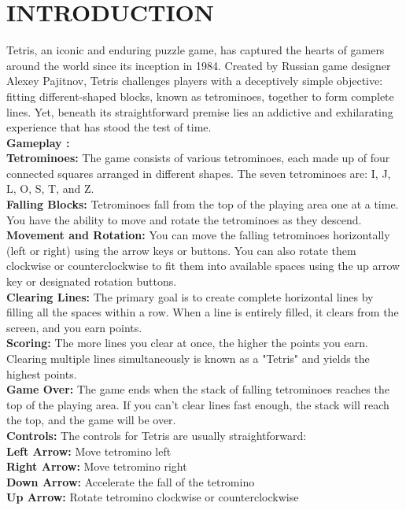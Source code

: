 \newpage
\section{INTRODUCTION}
\hspace{5mm}Tetris, an iconic and enduring puzzle game, has captured the hearts of gamers around the world since its inception in 1984. Created by Russian game designer Alexey Pajitnov, Tetris challenges players with a deceptively simple objective: fitting different-shaped blocks, known as tetrominoes, together to form complete lines. Yet, beneath its straightforward premise lies an addictive and exhilarating experience that has stood the test of time.\\

\textbf{Gameplay :} \\

\textbf{Tetrominoes:} The game consists of various tetrominoes, each made up of four connected squares arranged in different shapes. The seven tetrominoes are: I, J, L, O, S, T, and Z.\\

\textbf{Falling Blocks: }Tetrominoes fall from the top of the playing area one at a time. You have the ability to move and rotate the tetrominoes as they descend.\\

\textbf{Movement and Rotation:} You can move the falling tetrominoes horizontally (left or right) using the arrow keys or buttons. You can also rotate them clockwise or counterclockwise to fit them into available spaces using the up arrow key or designated rotation buttons.\\

\textbf{Clearing Lines:} The primary goal is to create complete horizontal lines by filling all the spaces within a row. When a line is entirely filled, it clears from the screen, and you earn points.\\

\textbf{Scoring:} The more lines you clear at once, the higher the points you earn. Clearing multiple lines simultaneously is known as a "Tetris" and yields the highest points.\\

\textbf{Game Over:} The game ends when the stack of falling tetrominoes reaches the top of the playing area. If you can't clear lines fast enough, the stack will reach the top, and the game will be over.\\

\textbf{Controls:} The controls for Tetris are usually straightforward:\vspace{1mm}\\
\textbf{Left Arrow: }Move tetromino left\\
\textbf{Right Arrow: }Move tetromino right\\
\textbf{Down Arrow: }Accelerate the fall of the tetromino\\
\textbf{Up Arrow: }Rotate tetromino clockwise or counterclockwise\\

